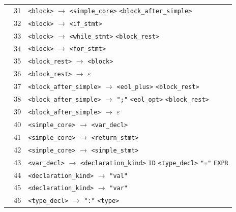 \documentclass[11pt,a4paper]{article}
\begin{document}
\begin{longtable}{@{}r@{\quad}>{\raggedright\arraybackslash}p{0.91\linewidth}@{}}
31 & \texttt{\textless{}block\textgreater{}} $\rightarrow$ \texttt{\textless{}simple\_core\textgreater{}} \texttt{\textless{}block\_after\_simple\textgreater{}} \\
32 & \texttt{\textless{}block\textgreater{}} $\rightarrow$ \texttt{\textless{}if\_stmt\textgreater{}} \\
33 & \texttt{\textless{}block\textgreater{}} $\rightarrow$ \texttt{\textless{}while\_stmt\textgreater{}} \texttt{\textless{}block\_rest\textgreater{}} \\
34 & \texttt{\textless{}block\textgreater{}} $\rightarrow$ \texttt{\textless{}for\_stmt\textgreater{}} \\
35 & \texttt{\textless{}block\_rest\textgreater{}} $\rightarrow$ \texttt{\textless{}block\textgreater{}} \\
36 & \texttt{\textless{}block\_rest\textgreater{}} $\rightarrow$ $\varepsilon$ \\
37 & \texttt{\textless{}block\_after\_simple\textgreater{}} $\rightarrow$ \texttt{\textless{}eol\_plus\textgreater{}} \texttt{\textless{}block\_rest\textgreater{}} \\
38 & \texttt{\textless{}block\_after\_simple\textgreater{}} $\rightarrow$ \texttt{";"} \texttt{\textless{}eol\_opt\textgreater{}} \texttt{\textless{}block\_rest\textgreater{}} \\
39 & \texttt{\textless{}block\_after\_simple\textgreater{}} $\rightarrow$ $\varepsilon$ \\
40 & \texttt{\textless{}simple\_core\textgreater{}} $\rightarrow$ \texttt{\textless{}var\_decl\textgreater{}} \\
41 & \texttt{\textless{}simple\_core\textgreater{}} $\rightarrow$ \texttt{\textless{}return\_stmt\textgreater{}} \\
42 & \texttt{\textless{}simple\_core\textgreater{}} $\rightarrow$ \texttt{\textless{}simple\_stmt\textgreater{}} \\
43 & \texttt{\textless{}var\_decl\textgreater{}} $\rightarrow$ \texttt{\textless{}declaration\_kind\textgreater{}} \texttt{ID} \texttt{\textless{}type\_decl\textgreater{}} \texttt{"="} \texttt{EXPR} \\
44 & \texttt{\textless{}declaration\_kind\textgreater{}} $\rightarrow$ \texttt{"val"} \\
45 & \texttt{\textless{}declaration\_kind\textgreater{}} $\rightarrow$ \texttt{"var"} \\
46 & \texttt{\textless{}type\_decl\textgreater{}} $\rightarrow$ \texttt{":"} \texttt{\textless{}type\textgreater{}} \\

\end{longtable}
\end{document}
